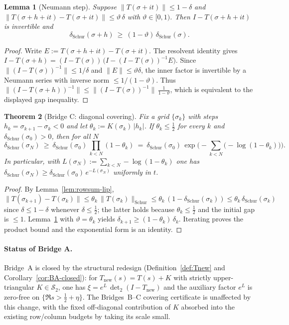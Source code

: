 \documentclass[11pt]{article}
\newtheorem{theorem}{Theorem}
\newtheorem{lemma}[theorem]{Lemma}
\theoremstyle{definition}
\theoremstyle{remark}
\newcommand{\HS}{\mathcal{S}_2}
\begin{document}
\begin{lemma}[Neumann step]\label{lem:neumann-step}
Suppose $\|T(\sigma+it)\|\le 1-\delta$ and $\|T(\sigma+h+it)-T(\sigma+it)\|\le \vartheta\,\delta$ with $\vartheta\in[0,1)$. Then $I-T(\sigma+h+it)$ is invertible and
\[
  \delta_{\mathrm{Schur}}(\sigma+h)\ \ge\ (1-\vartheta)\,\delta_{\mathrm{Schur}}(\sigma).
\]
\end{lemma}
\begin{proof}
Write $E:=T(\sigma+h+it)-T(\sigma+it)$. The resolvent identity gives $I-T(\sigma+h)= (I-T(\sigma))\,\big(I-(I-T(\sigma))^{-1}E\big)$. Since $\|(I-T(\sigma))^{-1}\|\le 1/\delta$ and $\|E\|\le \vartheta\delta$, the inner factor is invertible by a Neumann series with inverse norm $\le 1/(1-\vartheta)$. Thus $\|(I-T(\sigma+h))^{-1}\|\le \|(I-T(\sigma))^{-1}\|\,\frac{1}{1-\vartheta}$, which is equivalent to the displayed gap inequality.
\end{proof}

\begin{theorem}[Bridge C: diagonal covering]\label{thm:bridge-C}
Fix a grid $\{\sigma_k\}$ with steps $h_k=\sigma_{k+1}-\sigma_k<0$ and let $\theta_k:=K(\sigma_k)\,|h_k|$. If $\theta_k\le \tfrac12$ for every $k$ and $\delta_{\mathrm{Schur}}(\sigma_0)>0$, then for all $N$
\[
  \delta_{\mathrm{Schur}}(\sigma_N)\ \ge\ \delta_{\mathrm{Schur}}(\sigma_0)\,\prod_{k< N}(1-\theta_k)
  \ =\ \delta_{\mathrm{Schur}}(\sigma_0)\,\exp\!\Big(-\sum_{k< N}\!\big(-\log(1-\theta_k)\big)\Big).
\]
In particular, with $L(\sigma_N):=\sum_{k< N}-\log(1-\theta_k)$ one has $\delta_{\mathrm{Schur}}(\sigma_N)\ge \delta_{\mathrm{Schur}}(\sigma_0)\,e^{-L(\sigma_N)}$ uniformly in $t$.
\end{theorem}
\begin{proof}
By Lemma~\ref{lem:rowsum-lip}, $\|T(\sigma_{k+1})-T(\sigma_k)\|\le \theta_k\,\|T(\sigma_k)\|_{\mathrm{Schur}}\le \theta_k\,(1-\delta_{\mathrm{Schur}}(\sigma_k))\le \theta_k\,\delta_{\mathrm{Schur}}(\sigma_k)$ since $\delta\le 1-\delta$ whenever $\delta\le \tfrac12$; the latter holds because $\theta_k\le \tfrac12$ and the initial gap is $\le 1$. Lemma~\ref{lem:neumann-step} with $\vartheta=\theta_k$ yields $\delta_{k+1}\ge (1-\theta_k)\,\delta_k$. Iterating proves the product bound and the exponential form is an identity.
\end{proof}

\paragraph{Status of Bridge A.}
Bridge~A is closed by the structural redesign (Definition~\ref{def:Tnew} and Corollary~\ref{cor:BA-closed}): for $T_{\mathrm{new}}(s)=T(s)+K$ with strictly upper-triangular $K\in\HS$, one has $\xi=e^{L}\,\det_2(I-T_{\mathrm{new}})$ and the auxiliary factor $e^{L}$ is zero-free on $\{\Re s>\tfrac12+\eta\}$. The Bridges~B--C covering certificate is unaffected by this change, with the fixed off-diagonal contribution of $K$ absorbed into the existing row/column budgets by taking its scale small.
\end{document}

